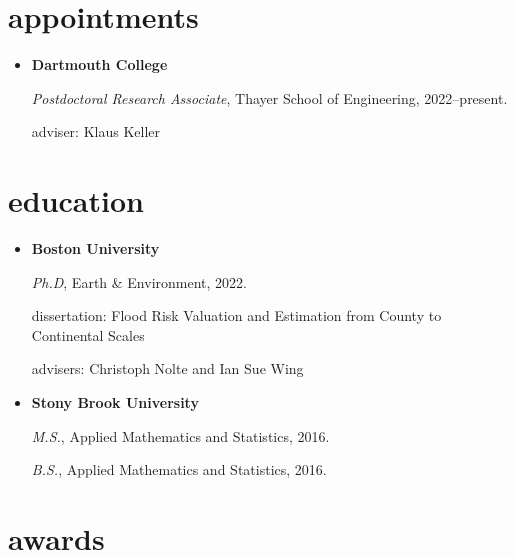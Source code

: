 \documentclass[10pt,oneside]{article}
\begin{document}

\section{appointments}

\mbox{}\vspace{-\dimexpr\baselineskip\relax}

\begin{itemize}[label={}]

  \item \textbf{Dartmouth College}

        \textit{Postdoctoral Research Associate}, Thayer School of Engineering, 2022--present.

        adviser: Klaus Keller



\end{itemize}


\section{education}

\mbox{}\vspace{-\dimexpr\baselineskip\relax}

\begin{itemize}[label={}]

  \item \textbf{Boston University}

        \textit{Ph.D}, Earth \& Environment, 2022.


        dissertation: Flood Risk Valuation and Estimation from County to Continental Scales

        advisers: Christoph Nolte and Ian Sue Wing


  \item \textbf{Stony Brook University}

        \textit{M.S.}, Applied Mathematics and Statistics, 2016.

        \textit{B.S.}, Applied Mathematics and Statistics, 2016.



\end{itemize}


\section{awards}
\end{document}
